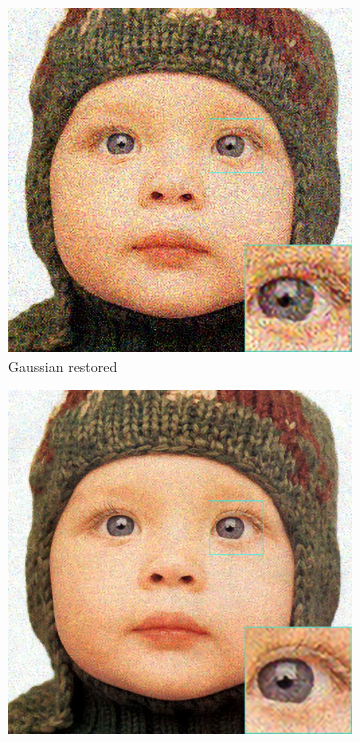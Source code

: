 \begin{figure}
	\centering
	\begin{subfigure}{0.24\textwidth}
		\includegraphics[width=\textwidth]{images/exp1.1/gaussian.png}
		\caption{Gaussian restored}
	\end{subfigure}
	\begin{subfigure}{0.24\textwidth}
		\includegraphics[width=\textwidth]{images/exp1.1/poisson.png}

\end{subfigure}
\end{figure}
